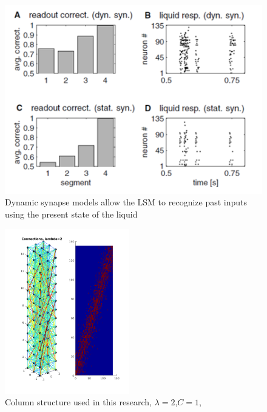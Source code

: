 \documentclass[a4paper,11pt]{article}
\begin{document}
\begin{figure}[p]
 \caption{Dynamic synapse models allow the LSM to recognize past inputs using the present state of the liquid \cite{maas2002}}
 \label{fig:lsm_memory}
 \centering
   \includegraphics[width=\textwidth]{fig/maas_memory}
\end{figure}

\begin{figure}[p]
 \caption{Column structure used in this research, $\lambda=2$,$C=1$,}
 \centering
   \includegraphics[width=0.48\textwidth]{fig/lambda2}
\end{figure}
\end{document}
